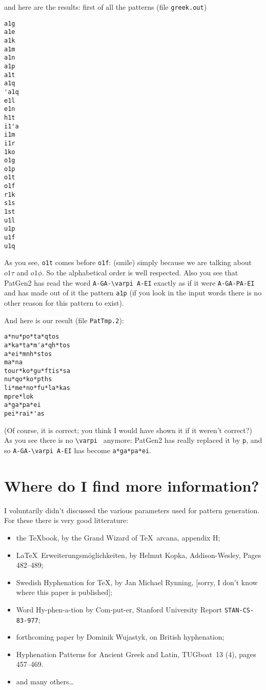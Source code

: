 and here are the results: first of all the patterns
(file {\tt greek.out})

\begin{verbatim}
a1g
a1e
a1k
a1m
a1n
a1p
a1t
a1q
'a1q
e1l
e1n
h1t
i1'a
i1m
i1r
1ko
o1g
o1p
o1t
o1f
r1k
s1s
1st
u1l
u1p
u1f
u1q
\end{verbatim}

As you see, {\tt o1t} comes before {\tt o1f}: (smile) simply
because we are talking about $o1\tau$ and $o1\phi$. So the
alphabetical order is well respected. Also you see that PatGen2
has read the word \verb*=A-GA-\varpi A-EI= exactly as if it
were \verb*=A-GA-PA-EI= and has made out of it the pattern
{\tt a1p} (if you look in the input words there is no other
reason for this pattern to exist).

And here is our result (file {\tt PatTmp.2}):

\begin{verbatim}
a*nu*po*ta*qtos
a*ka*ta*m'a*qh*tos
a*ei*mnh*stos
ma*na
tour*ko*gu*ftis*sa
nu*qo*ko*pths
li*me*no*fu*la*kas
mpre*lok
a*ga*pa*ei
pei*rai*'as
\end{verbatim}

(Of course, it is correct; you think I would have shown it if it
weren't correct?) As you see there is no \verb*=\varpi = anymore:
PatGen2 has really replaced it by \verb=p=, and so
\verb*=A-GA-\varpi A-EI= has become \verb=a*ga*pa*ei=.

\section{Where do I find more information?}
I voluntarily didn't discussed the various parameters used for
pattern generation. For these there is very good litterature:
\begin{itemize}
\item the \TeX book, by the Grand Wizard of \TeX\ arcana,
appendix H;
\item \LaTeX\ Erweiterungsm\"oglichkeiten, by Helmut Kopka,
Addison-Wesley, Pages 482--489;
\item Swedish Hyphenation for \TeX, by Jan Michael Rynning,
[sorry, I don't know where this paper is published];
\item Word Hy-phen-a-tion by Com-put-er, Stanford University
Report {\tt STAN-CS-83-977};
\item forthcoming paper by Dominik Wujastyk, on British
hyphenation;
\item Hyphenation Patterns for Ancient Greek and Latin,
TUGboat~13 (4), pages 457--469.
\item and many others\ldots
\end{itemize}

